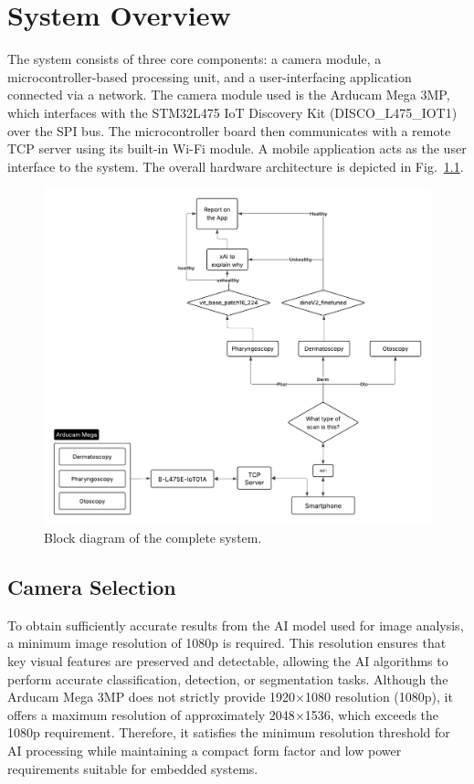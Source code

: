 \chapter{System Overview}

The system consists of three core components: a camera module, a microcontroller-based processing unit, and a user-interfacing application connected via a network. The camera module used is the Arducam Mega 3MP, which interfaces with the STM32L475 IoT Discovery Kit (DISCO\_L475\_IOT1) over the SPI bus. The microcontroller board then communicates with a remote TCP server using its built-in Wi-Fi module. A mobile application acts as the user interface to the system. The overall hardware architecture is depicted in Fig.~\ref{overall}.

\begin{figure}[h!]
  \centering
  \includegraphics[width=0.8\linewidth]{system_diagram.png}
  \caption{Block diagram of the complete system.}
  \label{overall}
\end{figure}

\section{Camera Selection}

To obtain sufficiently accurate results from the AI model used for image analysis, a minimum image resolution of 1080p is required. This resolution ensures that key visual features are preserved and detectable, allowing the AI algorithms to perform accurate classification, detection, or segmentation tasks. Although the Arducam Mega 3MP does not strictly provide 1920$\times$1080 resolution (1080p), it offers a maximum resolution of approximately 2048$\times$1536, which exceeds the 1080p requirement. Therefore, it satisfies the minimum resolution threshold for AI processing while maintaining a compact form factor and low power requirements suitable for embedded systems.


